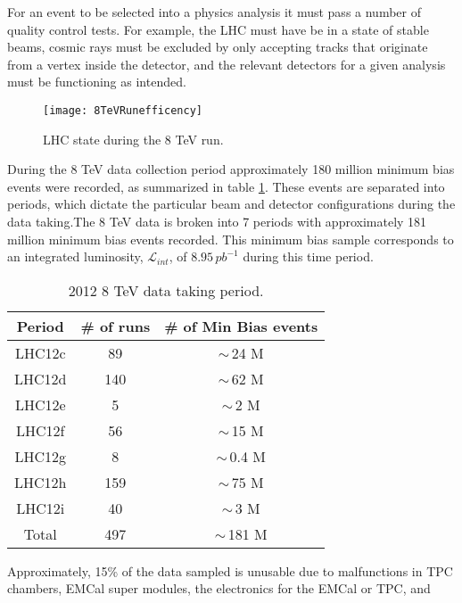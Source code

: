 For an event to be selected into a physics analysis it must pass a number of quality control tests.  For example, the LHC must have be in a state of stable beams, cosmic rays must be excluded by only accepting tracks that originate from a vertex inside the detector, and the relevant detectors for a given analysis must be functioning as intended.  

\begin{figure}[h]
\texttt{[image: 8TeVRunefficency]}
\centering
\caption{LHC state during the 8 TeV run. }
\label{fig:RunEff}
\end{figure}

During the 8 TeV data collection period approximately 180 million minimum bias events were recorded, as summarized in table \ref{tab:RunSummary}.  These events are separated into periods, which dictate the particular beam and detector configurations during the data taking.The 8 TeV data is broken into 7 periods with approximately 181 million minimum bias events recorded.  This minimum bias sample corresponds to an integrated luminosity, $\mathscr{L}_{int}$, of $8.95 \, pb^{-1}$ during this time period\cite{ALICE-PUBLIC-2017-002}.

\begin{table}[hb]
\label{tab:RunSummary}
\begin{center}
\begin{tabular}[b]{|c|c|c|}
	\hline
	Period & \# of runs & \# of Min Bias events \\ \hline
	LHC12c & 89 & $\sim \,$24 M \\ \hline
	LHC12d & 140 & $\sim \,$62 M \\ \hline
	LHC12e & 5 & $\sim \,$2 M \\ \hline
	LHC12f & 56 & $\sim \,$15 M \\ \hline
	LHC12g & 8 & $\sim \,$0.4 M \\ \hline
	LHC12h & 159 & $\sim \,$75 M \\ \hline
	LHC12i & 40 & $\sim \,$3 M \\ \hline
	Total & 497 & $\sim \,$181 M \\ \hline

\end{tabular}
\end{center}
\caption{2012 8 TeV data taking period.}
\end{table}

Approximately, 15\% of the data sampled is unusable due to malfunctions in TPC chambers, EMCal super modules, the electronics for the EMCal or TPC, and   
